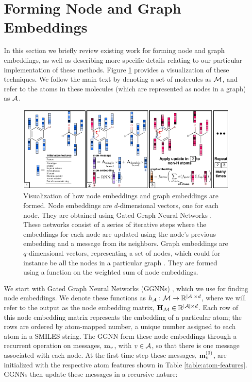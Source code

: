 \section{Forming Node and Graph Embeddings}

In this section we briefly review existing work for forming node and graph embeddings, as well as describing more specific details relating to our particular implementation of these methods. Figure \ref{fig:graph_nn} provides a visualization of these techniques. 
We follow the main text by denoting a set of molecules as ${\mathcal{M}}$, and refer to the atoms in these molecules (which are represented as nodes in a graph) as ${\mathcal{A}}$.


\begin{figure}
\centering
\includegraphics[width=\textwidth]{imgs/graph_nn}
\caption{
Visualization of how node embeddings and graph embeddings are formed. 
Node embeddings are $d$-dimensional vectors, one for each node. 
They are obtained using Gated Graph Neural Networks \citep{li2016gated}.
These networks consist of a series of iterative steps where the embeddings for each node are updated using the node's previous embedding and a message from its neighbors.
 Graph embeddings are $q$-dimensional vectors, representing a set of nodes, which could for instance be all the nodes in a particular graph \citep{li2018learning}.
  They are formed using a function on the weighted sum of node embeddings.
}
\label{fig:graph_nn}
\end{figure}


 We start with Gated Graph Neural Networks (GGNNs) \citep{li2016gated, gilmer2017neural}, which we use for finding node embeddings.
 We denote these functions as $h_{{\mathcal{A}}}: {\mathcal{M}} \to \mathbb{R}^{|{\mathcal{A}}|\times d}$, where we will refer to the output as the node embedding matrix, ${\mathbf{H}}_{{\mathcal{M}}} \in \mathbb{R}^{|{\mathcal{A}}|\times d}$. 
Each row of this node embedding matrix represents the embedding of a particular atom; the rows are ordered by atom-mapped number, a unique number assigned to each atom in a SMILES string.
The GGNN form these node embeddings through a recurrent operation on messages, ${\mathbf{m}}_v$, with $v \in {\mathcal{A}}$, so that there is one message associated with each node.
At the first time step these messages, ${\mathbf{m}}_v^{(0)}$, are initialized with the respective atom features shown in Table \ref{table:atom-features}. GGNNs then update these messages in a recursive nature:

